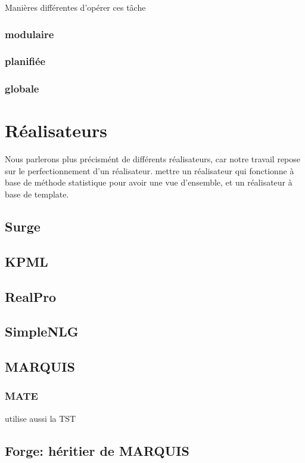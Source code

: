 Manières différentes d'opérer ces tâche

\subsubsection{modulaire}
\subsubsection{planifiée}
\subsubsection{globale}

\section{Réalisateurs}

Nous parlerons plus précismént de différents réalisateurs, car notre travail repose sur le perfectionnement d'un réalisateur.
mettre un réalisateur qui fonctionne à base de méthode statistique pour avoir une vue d'ensemble, et un réalisateur à base de template.

\subsection{Surge}

\subsection{KPML}

\subsection{RealPro}

\subsection{SimpleNLG}

\subsection{MARQUIS}
\subsubsection{MATE}
utilise aussi la TST

\subsection{Forge: héritier de MARQUIS}

